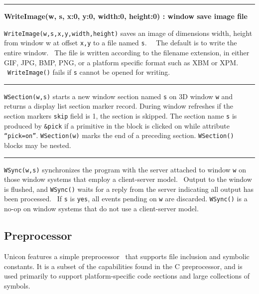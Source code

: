\bigskip\hrule\vspace{0.1cm}
\noindent
{\bf WriteImage(w, s, x:0, y:0, width:0, height:0) : window
\hfill save image file}

\noindent
\texttt{WriteImage(w,s,x,y,width,height)} saves an image of dimensions
width, height from window w at offset \texttt{x,y} to a file named
\texttt{s}. \ \ The default is to write the entire window. \ The file
is written according to the filename extension, in either GIF, JPG,
BMP, PNG, or a platform specific format such as XBM or XPM.
\ \texttt{WriteImage()} fails if \texttt{s} cannot be opened for
writing.

\bigskip\hrule\vspace{0.1cm}

\noindent
\texttt{WSection(w,s)} starts a new window section named \texttt{s} on
3D window \texttt{w} and returns a display list section marker record.
During window refreshes if the section marker{\textquotesingle}s
\texttt{skip} field is 1, the section is skipped. The section name
\texttt{s} is produced by \texttt{\&pick} if a primitive in the block
is clicked on while attribute
\texttt{{\textquotedblleft}pick=on{\textquotedblright}}.
\texttt{WSection(w)} marks the end of a preceding section.
\texttt{WSection()} blocks may be nested.

\bigskip\hrule\vspace{0.1cm}

\noindent
\texttt{WSync(w,s)} synchronizes the program with the server attached to
window \texttt{w} on those window systems that employ a client-server
model. \ Output to the window is flushed, and \texttt{WSync()} waits
for a reply from the server indicating all output has been processed.
\ If \texttt{s} is \texttt{{\textquotedbl}yes{\textquotedbl}}, all
events pending on \texttt{w} are discarded. \texttt{WSync()} is a no-op
on window systems that do not use a client-server model.

\subsection{Preprocessor}

Unicon features a simple preprocessor \ that
supports file inclusion and symbolic constants. It is a subset of the
capabilities found in the C preprocessor, and is used primarily to
support platform-specific code sections and large collections of
symbols.

